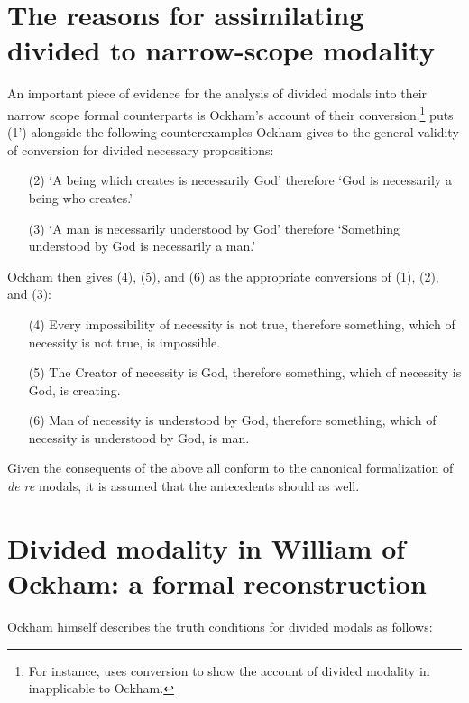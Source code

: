 \documentclass[]{article}
\begin{document}
\section[The assimilation of divided to narrow-scope modality]{The reasons for assimilating divided to narrow-scope modality}
An important piece of evidence for the analysis of divided modals into their narrow scope formal counterparts is Ockham's account of their conversion.\footnote{For instance, \cite[p. 276]{PriestRead1981} uses conversion to show the account of divided modality in \cite[sec. 12]{Moody1952} inapplicable to Ockham.} \cite[p. 242]{Johnston2015} puts (1') alongside the following counterexamples Ockham gives to the general validity of conversion for divided necessary propositions:
\begin{enumerate}
	\item[(2)]	`A being which creates is necessarily God' therefore `God is necessarily a being who creates.' 
	\item[(3)]	`A man is necessarily understood by God' therefore `Something understood by God is necessarily a man.' \cite[II.24, p. 329]{OckhamSL}
\end{enumerate}

Ockham then gives (4), (5), and (6) as the appropriate conversions of (1), (2), and (3):

\begin{enumerate}
	\item[(4)]	Every impossibility of necessity is not true, therefore something, which of necessity is not true, is impossible.
	\item[(5)]	The Creator of necessity is God, therefore something, which of necessity is God, is creating.
	\item[(6)]	Man of necessity is understood by God, therefore something, which of necessity is understood by God, is man. \cite[II.24, p. 329]{OckhamSL}
\end{enumerate}

Given the consequents of the above all conform to the canonical formalization of \textit{de re} modals, it is assumed that the antecedents should as well.
\section[Divided modality in William of Ockham]{Divided modality in William of Ockham: a formal reconstruction}
Ockham himself describes the truth conditions for divided modals as follows:
\end{document}
